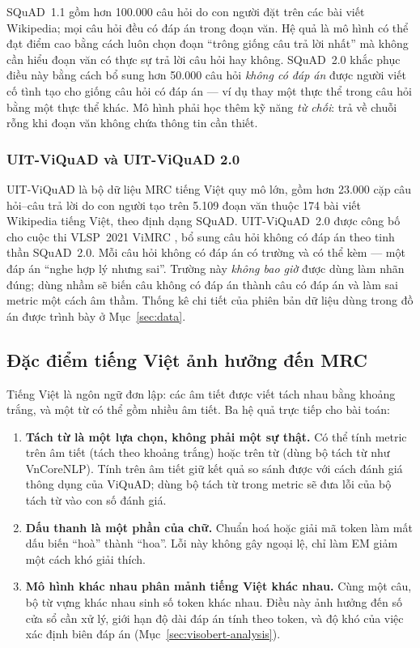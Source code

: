 SQuAD~1.1 \cite{rajpurkar2016squad} gồm hơn 100.000 câu hỏi do con người đặt trên các
bài viết Wikipedia; mọi câu hỏi đều có đáp án trong đoạn văn. Hệ quả là mô hình có thể
đạt điểm cao bằng cách luôn chọn đoạn ``trông giống câu trả lời nhất'' mà không cần
hiểu đoạn văn có thực sự trả lời câu hỏi hay không. SQuAD~2.0 \cite{rajpurkar2018know}
khắc phục điều này bằng cách bổ sung hơn 50.000 câu hỏi \emph{không có đáp án} được
người viết cố tình tạo cho giống câu hỏi có đáp án --- ví dụ thay một thực thể trong câu
hỏi bằng một thực thể khác. Mô hình phải học thêm kỹ năng \emph{từ chối}: trả về chuỗi
rỗng khi đoạn văn không chứa thông tin cần thiết.

\subsubsection{UIT-ViQuAD và UIT-ViQuAD 2.0}

UIT-ViQuAD \cite{nguyen2020viquad} là bộ dữ liệu MRC tiếng Việt quy mô lớn, gồm hơn
23.000 cặp câu hỏi--câu trả lời do con người tạo trên 5.109 đoạn văn thuộc 174 bài viết
Wikipedia tiếng Việt, theo định dạng SQuAD. UIT-ViQuAD~2.0 được công bố cho cuộc thi
VLSP~2021 ViMRC \cite{nguyen2022vlsp}, bổ sung câu hỏi không có đáp án theo tinh thần
SQuAD~2.0. Mỗi câu hỏi không có đáp án có trường  và có thể
kèm  --- một đáp án ``nghe hợp lý nhưng sai''. Trường này
\emph{không bao giờ} được dùng làm nhãn đúng; dùng nhầm sẽ biến câu không có đáp án
thành câu có đáp án và làm sai metric một cách âm thầm. Thống kê chi tiết của phiên bản
dữ liệu dùng trong đồ án được trình bày ở Mục~\ref{sec:data}.

\subsection{Đặc điểm tiếng Việt ảnh hưởng đến MRC}
\label{sec:vietnamese}

Tiếng Việt là ngôn ngữ đơn lập: các âm tiết được viết tách nhau bằng khoảng trắng, và
một từ có thể gồm nhiều âm tiết. Ba hệ quả trực tiếp cho bài toán:

\begin{enumerate}
  \item \textbf{Tách từ là một lựa chọn, không phải một sự thật.} Có thể tính metric
        trên âm tiết (tách theo khoảng trắng) hoặc trên từ (dùng bộ tách từ như
        VnCoreNLP). Tính trên âm tiết giữ kết quả so sánh được với cách đánh giá thông
        dụng của ViQuAD; dùng bộ tách từ trong metric sẽ đưa lỗi của bộ tách từ vào
        con số đánh giá.
  \item \textbf{Dấu thanh là một phần của chữ.} Chuẩn hoá hoặc giải mã token làm mất
        dấu biến ``hoà'' thành ``hoa''. Lỗi này không gây ngoại lệ, chỉ làm EM giảm một
        cách khó giải thích.
  \item \textbf{Mô hình khác nhau phân mảnh tiếng Việt khác nhau.} Cùng một câu, bộ từ
        vựng khác nhau sinh số token khác nhau. Điều này ảnh hưởng đến số cửa sổ cần xử
        lý, giới hạn độ dài đáp án tính theo token, và độ khó của việc xác định biên đáp
        án (Mục~\ref{sec:visobert-analysis}).
\end{enumerate}

